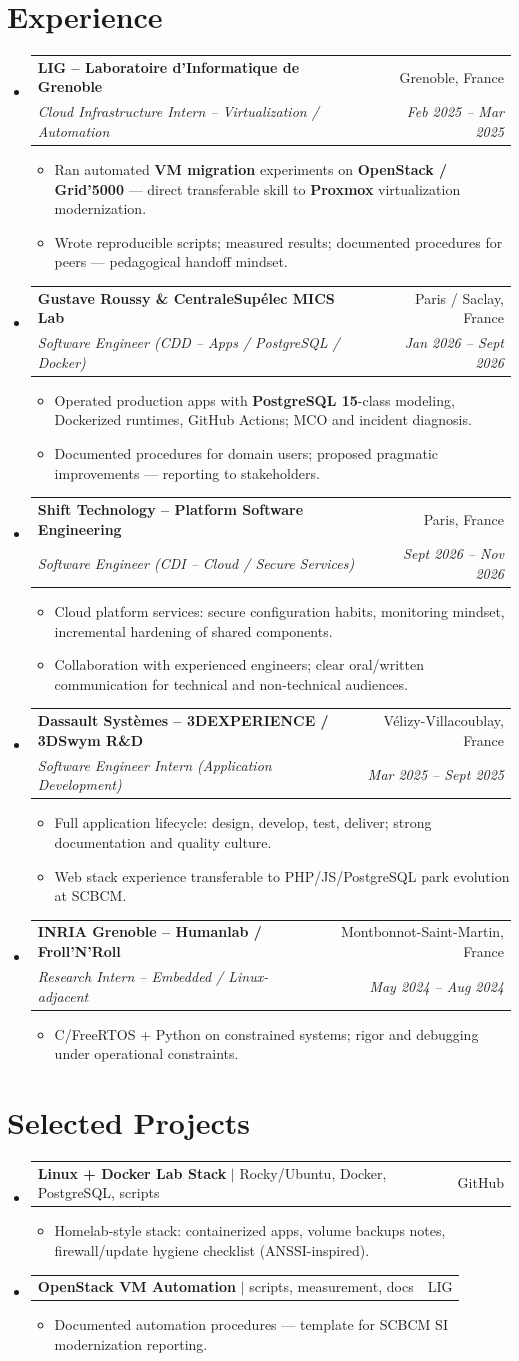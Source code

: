 \documentclass[letterpaper,10.5pt]{article}
\makeatletter
\newcommand{\resumeItem}[1]{\item\small{#1 \vspace{-1.5pt}}}
\newcommand{\resumeSubheading}[4]{\vspace{-1pt}\item\begin{tabular*}{0.97\textwidth}[t]{l@{\extracolsep{\fill}}r}\textbf{#1} & #2 \\\textit{\small#3} & \textit{\small #4} \\\end{tabular*}\vspace{-5pt}}
\newcommand{\resumeProjectHeading}[2]{\item\begin{tabular*}{0.97\textwidth}{l@{\extracolsep{\fill}}r}\small#1 & #2 \\\end{tabular*}\vspace{-5pt}}
\newcommand{\resumeSubHeadingListStart}{\begin{itemize}[leftmargin=0.15in, label={}]}
\newcommand{\resumeSubHeadingListEnd}{\end{itemize}}
\newcommand{\resumeItemListStart}{\begin{itemize}[leftmargin=0.18in]}
\newcommand{\resumeItemListEnd}{\end{itemize}\vspace{-3pt}}
\makeatother
\begin{document}
\section{Experience}
\resumeSubHeadingListStart
  \resumeSubheading
    {LIG -- Laboratoire d'Informatique de Grenoble}{Grenoble, France}
    {Cloud Infrastructure Intern -- Virtualization / Automation}{Feb 2025 -- Mar 2025}
    \resumeItemListStart
      \resumeItem{Ran automated \textbf{VM migration} experiments on \textbf{OpenStack / Grid'5000} --- direct transferable skill to \textbf{Proxmox} virtualization modernization.}
      \resumeItem{Wrote reproducible scripts; measured results; documented procedures for peers --- pedagogical handoff mindset.}
    \resumeItemListEnd
  \resumeSubheading
    {Gustave Roussy \& CentraleSup\'elec MICS Lab}{Paris / Saclay, France}
    {Software Engineer (CDD -- Apps / PostgreSQL / Docker)}{Jan 2026 -- Sept 2026}
    \resumeItemListStart
      \resumeItem{Operated production apps with \textbf{PostgreSQL 15}-class modeling, Dockerized runtimes, GitHub Actions; MCO and incident diagnosis.}
      \resumeItem{Documented procedures for domain users; proposed pragmatic improvements --- reporting to stakeholders.}
    \resumeItemListEnd
  \resumeSubheading
    {Shift Technology -- Platform Software Engineering}{Paris, France}
    {Software Engineer (CDI -- Cloud / Secure Services)}{Sept 2026 -- Nov 2026}
    \resumeItemListStart
      \resumeItem{Cloud platform services: secure configuration habits, monitoring mindset, incremental hardening of shared components.}
      \resumeItem{Collaboration with experienced engineers; clear oral/written communication for technical and non-technical audiences.}
    \resumeItemListEnd
  \resumeSubheading
    {Dassault Syst\`emes -- 3DEXPERIENCE / 3DSwym R\&D}{V\'elizy-Villacoublay, France}
    {Software Engineer Intern (Application Development)}{Mar 2025 -- Sept 2025}
    \resumeItemListStart
      \resumeItem{Full application lifecycle: design, develop, test, deliver; strong documentation and quality culture.}
      \resumeItem{Web stack experience transferable to PHP/JS/PostgreSQL park evolution at SCBCM.}
    \resumeItemListEnd
  \resumeSubheading
    {INRIA Grenoble -- Humanlab / Froll'N'Roll}{Montbonnot-Saint-Martin, France}
    {Research Intern -- Embedded / Linux-adjacent}{May 2024 -- Aug 2024}
    \resumeItemListStart
      \resumeItem{C/FreeRTOS + Python on constrained systems; rigor and debugging under operational constraints.}
    \resumeItemListEnd
\resumeSubHeadingListEnd
\section{Selected Projects}
\resumeSubHeadingListStart
  \resumeProjectHeading{\textbf{Linux + Docker Lab Stack} $|$ Rocky/Ubuntu, Docker, PostgreSQL, scripts}{GitHub}
    \resumeItemListStart
      \resumeItem{Homelab-style stack: containerized apps, volume backups notes, firewall/update hygiene checklist (ANSSI-inspired).}
    \resumeItemListEnd
  \resumeProjectHeading{\textbf{OpenStack VM Automation} $|$ scripts, measurement, docs}{LIG}
    \resumeItemListStart
      \resumeItem{Documented automation procedures --- template for SCBCM SI modernization reporting.}
    \resumeItemListEnd
\resumeSubHeadingListEnd
\end{document}
